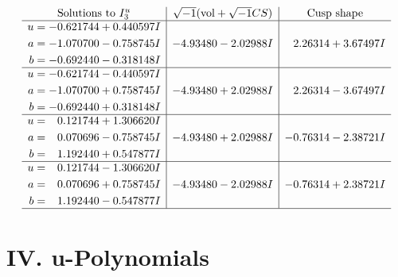\documentclass[1p]{elsarticle_modified}
\theoremstyle{definition}
\newcommand{\I}{\sqrt{-1}}
\begin{document}
$$\begin{array}{c|c|c}  
\text{Solutions to }I^u_{3}& \I (\text{vol} + \sqrt{-1}CS) & \text{Cusp shape}\\
 \hline 
\begin{aligned}
u &= -0.621744 + 0.440597 I \\
a &= -1.070700 - 0.758745 I \\
b &= -0.692440 - 0.318148 I\end{aligned}
 & -4.93480 - 2.02988 I & \phantom{-}2.26314 + 3.67497 I \\ \hline\begin{aligned}
u &= -0.621744 - 0.440597 I \\
a &= -1.070700 + 0.758745 I \\
b &= -0.692440 + 0.318148 I\end{aligned}
 & -4.93480 + 2.02988 I & \phantom{-}2.26314 - 3.67497 I \\ \hline\begin{aligned}
u &= \phantom{-}0.121744 + 1.306620 I \\
a &= \phantom{-}0.070696 - 0.758745 I \\
b &= \phantom{-}1.192440 + 0.547877 I\end{aligned}
 & -4.93480 + 2.02988 I & -0.76314 - 2.38721 I \\ \hline\begin{aligned}
u &= \phantom{-}0.121744 - 1.306620 I \\
a &= \phantom{-}0.070696 + 0.758745 I \\
b &= \phantom{-}1.192440 - 0.547877 I\end{aligned}
 & -4.93480 - 2.02988 I & -0.76314 + 2.38721 I\\
 \hline 
 \end{array}$$\newpage
\newpage\renewcommand{\arraystretch}{1}
\centering \section*{ IV. u-Polynomials}
\end{document}
